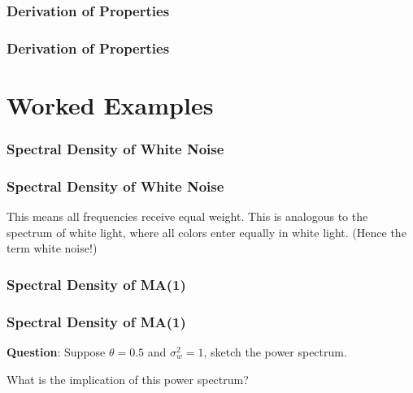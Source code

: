 \documentclass[%
xcolor=pdftex]{beamer}
\begin{document}
\begin{frame}
\frametitle{Derivation of Properties}



\end{frame}

\begin{frame}
\frametitle{Derivation of Properties}



\end{frame}






\section{Worked Examples}
\frame{\tableofcontents[currentsection]}


\begin{frame}
\frametitle{Spectral Density of White Noise}



\end{frame}

\begin{frame}
\frametitle{Spectral Density of White Noise}

This means all frequencies receive equal weight. This is analogous to the spectrum of white light, where all colors enter equally in white light. (Hence the term white noise!)


\end{frame}

\begin{frame}
\frametitle{Spectral Density of MA(1)}



\end{frame}

\begin{frame}
\frametitle{Spectral Density of MA(1)}

\textbf{Question}: Suppose $\theta=0.5$ and $\sigma_w^2=1$, sketch the power spectrum.

\vspace{40mm}

What is the implication of this power spectrum?

\end{frame}
\end{document}
